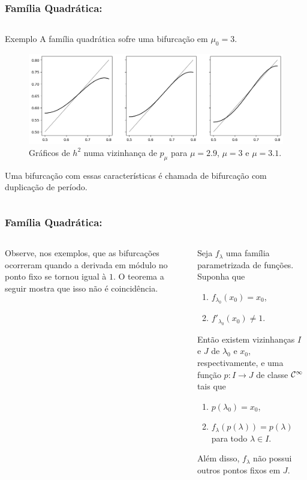 
\begin{frame}
\vspace{5pt}
\frametitle{Família Quadrática: \subsecname}
\begin{columns}
\column{\dimexpr\paperwidth-15pt}

\begin{block}{Exemplo}
A família quadrática sofre uma bifurcação em $\mu_0 = 3$.

\begin{figure}[!htb]
\centering
\includegraphics[scale=0.4]{images/h_3^2.png}
\caption{Gráficos de $h^2$ numa vizinhança de $p_\mu$ para $\mu = 2.9$, $\mu = 3$ e $\mu = 3.1$.}
\label{h_mu^2}
\end{figure}

Uma bifurcação com essas características é chamada de bifurcação com duplicação de período.
\end{block}

\end{columns}
\end{frame}


\begin{frame}
\vspace{5pt}
\frametitle{Família Quadrática: \subsecname}
\begin{columns}
\column{\dimexpr\paperwidth-15pt}

Observe, nos exemplos, que as bifurcações ocorreram quando a derivada em módulo no ponto fixo se tornou igual à $1$. O teorema a seguir mostra que isso não é coincidência.

\begin{theorem}
Seja $f_\lambda$ uma família parametrizada de funções.
Suponha que
\begin{enumerate}
\item $f_{\lambda_0}(x_0) = x_0$,
\item $f'_{\lambda_0}(x_0) \neq 1$. 
\end{enumerate}
Então existem vizinhanças $I$ e $J$ de $\lambda_0$ e $x_0$, respectivamente, e uma função $p: I \to J$ de classe $\mathcal{C}^\infty$ tais que
\begin{enumerate}
\item $p(\lambda_0) = x_0$, 
\item $f_\lambda(p(\lambda)) = p(\lambda)$ para todo $\lambda \in I$.
\end{enumerate}
Além disso, $f_\lambda$ não possui outros pontos fixos em $J$.
\end{theorem}

\end{columns}
\end{frame}

